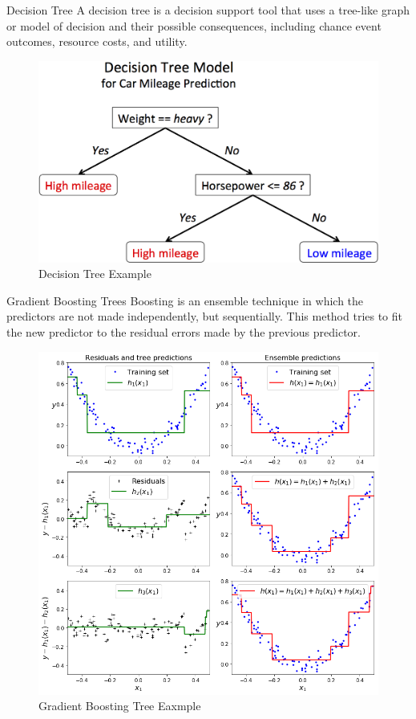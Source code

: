 \documentclass{beamer}
\begin{document}
\begin{frame}{Decision Tree}
A decision tree is a decision support tool that uses a tree-like graph or model of decision and their possible consequences, including chance event outcomes, resource costs, and utility.
\begin{figure}
  \includegraphics[width=0.6\linewidth]{pic/decision_trees.png}
  \caption{Decision Tree Example}
  \label{fig:dr_eg}
\end{figure}
\end{frame}

\begin{frame}{Gradient Boosting Trees}
Boosting is an ensemble technique in which the predictors are not made independently, but sequentially. This method tries to fit the new predictor to the residual errors made by the previous predictor. 
\begin{figure}
  \includegraphics[width=0.45\linewidth]{pic/gradient_boosting.png}
  \caption{Gradient Boosting Tree Eaxmple}
  \label{fig:gbt_eg}
\end{figure}

\end{frame}
\end{document}
